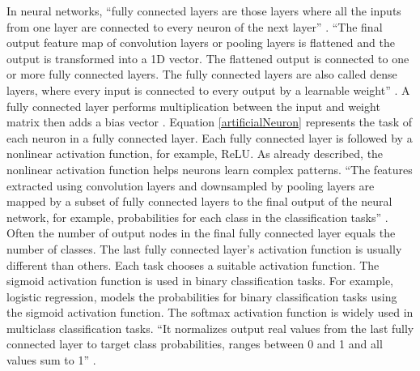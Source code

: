 In neural networks, ``fully connected layers are those layers where all the inputs from one layer are connected to every neuron of the next layer'' \cite{articleCNNs}. ``The final output feature map of convolution layers or pooling layers is flattened and the output is transformed into a \ac{1D} vector. The flattened output is connected to one or more fully connected layers. The fully connected layers are also called dense layers, where every input is connected to every output by a learnable weight'' \cite{articleCNNs}. A fully connected layer performs multiplication between the input and weight matrix then adds a bias vector \cite{articleCNNs}. Equation \ref{artificialNeuron} represents the task of each neuron in a fully connected layer. Each fully connected layer is followed by a nonlinear activation function, for example, \ac{ReLU}. As already described, the nonlinear activation function helps neurons learn complex patterns. ``The features extracted using convolution layers and downsampled by pooling layers are mapped by a subset of fully connected layers to the final output of the neural network, for example, probabilities for each class in the classification tasks'' \cite{articleCNNs}. Often the number of output nodes in the final fully connected layer equals the number of classes. The last fully connected layer's activation function is usually different than others. Each task chooses a suitable activation function. The sigmoid activation function is used in binary classification tasks. For example, logistic regression, models the probabilities for binary classification tasks using the sigmoid activation function\footnotemark. The softmax activation function is widely used in multiclass classification tasks. ``It normalizes output real values from the last fully connected layer to target class probabilities, ranges between 0 and 1 and all values sum to 1'' \cite{articleCNNs}.































